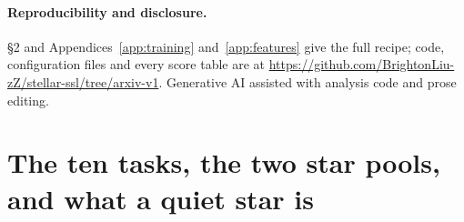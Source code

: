 \documentclass{article}
\begin{document}
\paragraph{Reproducibility and disclosure.} \S2 and Appendices~\ref{app:training}
and~\ref{app:features} give the full recipe; code, configuration files and every score table are at
\url{https://github.com/BrightonLiu-zZ/stellar-ssl/tree/arxiv-v1}. Generative AI assisted with
analysis code and prose editing.

\raggedbottom



\appendix

\section{The ten tasks, the two star pools, and what a quiet star is}
\label{app:pools}
\end{document}
